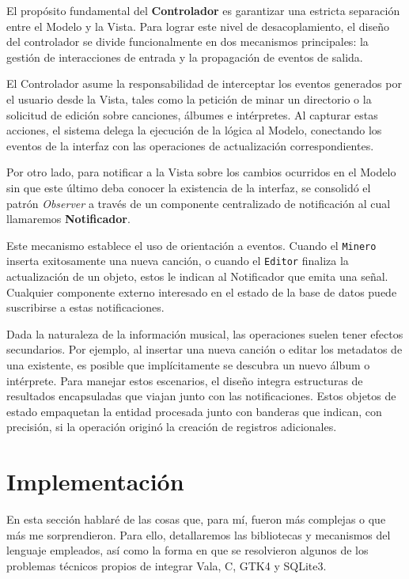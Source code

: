 \documentclass{rep}
\begin{document}
    El propósito fundamental del \textbf{Controlador} es garantizar
    una estricta separación entre el Modelo y la Vista.  Para lograr
    este nivel de desacoplamiento, el diseño del controlador se divide
    funcionalmente en dos mecanismos principales: la gestión de
    interacciones de entrada y la propagación de eventos de salida.

    El Controlador asume la responsabilidad de interceptar los eventos
    generados por el usuario desde la Vista, tales como la petición de
    minar un directorio o la solicitud de edición sobre canciones,
    álbumes e intérpretes. Al capturar estas acciones, el sistema
    delega la ejecución de la lógica al Modelo, conectando los eventos
    de la interfaz con las operaciones de actualización
    correspondientes.

    Por otro lado, para notificar a la Vista sobre los cambios
    ocurridos en el Modelo sin que este último deba conocer la
    existencia de la interfaz, se consolidó el patrón
    \textit{Observer} a través de un componente centralizado de
    notificación al cual llamaremos \textbf{Notificador}.
    
    Este mecanismo establece el uso de orientación a eventos. Cuando
    el \texttt{Minero} inserta exitosamente una nueva canción, o
    cuando el \texttt{Editor} finaliza la actualización de un objeto,
    estos le indican al Notificador que emita una señal. Cualquier
    componente externo interesado en el estado de la base de datos
    puede suscribirse a estas notificaciones.

    Dada la naturaleza de la información musical, las operaciones
    suelen tener efectos secundarios. Por ejemplo, al insertar una
    nueva canción o editar los metadatos de una existente, es posible
    que implícitamente se descubra un nuevo álbum o intérprete. Para
    manejar estos escenarios, el diseño integra estructuras de
    resultados encapsuladas que viajan junto con las
    notificaciones. Estos objetos de estado empaquetan la entidad
    procesada junto con banderas que indican, con precisión, si la
    operación originó la creación de registros adicionales.
    
    \section{Implementación}

    En esta sección hablaré de las cosas que, para mí, fueron más
    complejas o que más me sorprendieron. Para ello, detallaremos las
    bibliotecas y mecanismos del lenguaje empleados, así como la forma
    en que se resolvieron algunos de los problemas técnicos propios de
    integrar Vala, C, GTK4 y SQLite3.
\end{document}
